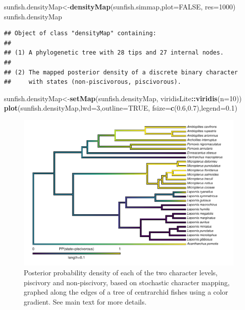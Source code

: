 \documentclass[fleqn,10pt,lineno]{wlpeerj} %
\newenvironment{Shaded}{\begin{snugshade}}{\end{snugshade}}
\newcommand{\AttributeTok}[1]{\textcolor[rgb]{0.13,0.29,0.53}{#1}}
\newcommand{\ConstantTok}[1]{\textcolor[rgb]{0.56,0.35,0.01}{#1}}
\newcommand{\DecValTok}[1]{\textcolor[rgb]{0.00,0.00,0.81}{#1}}
\newcommand{\FloatTok}[1]{\textcolor[rgb]{0.00,0.00,0.81}{#1}}
\newcommand{\FunctionTok}[1]{\textcolor[rgb]{0.13,0.29,0.53}{\textbf{#1}}}
\newcommand{\NormalTok}[1]{#1}
\newcommand{\OtherTok}[1]{\textcolor[rgb]{0.56,0.35,0.01}{#1}}
\newcommand{\SpecialCharTok}[1]{\textcolor[rgb]{0.81,0.36,0.00}{\textbf{#1}}}
\begin{document}
\begin{Shaded}
\begin{Highlighting}[]
\NormalTok{sunfish.densityMap}\OtherTok{\textless{}{-}}\FunctionTok{densityMap}\NormalTok{(sunfish.simmap,}\AttributeTok{plot=}\ConstantTok{FALSE}\NormalTok{,}
  \AttributeTok{res=}\DecValTok{1000}\NormalTok{)}
\NormalTok{sunfish.densityMap}
\end{Highlighting}
\end{Shaded}

\begin{verbatim}
## Object of class "densityMap" containing:
## 
## (1) A phylogenetic tree with 28 tips and 27 internal nodes.
## 
## (2) The mapped posterior density of a discrete binary character
##     with states (non-piscivorous, piscivorous).
\end{verbatim}

\begin{Shaded}
\begin{Highlighting}[]
\NormalTok{sunfish.densityMap}\OtherTok{\textless{}{-}}\FunctionTok{setMap}\NormalTok{(sunfish.densityMap,}
\NormalTok{  viridisLite}\SpecialCharTok{::}\FunctionTok{viridis}\NormalTok{(}\AttributeTok{n=}\DecValTok{10}\NormalTok{))}
\FunctionTok{plot}\NormalTok{(sunfish.densityMap,}\AttributeTok{lwd=}\DecValTok{3}\NormalTok{,}\AttributeTok{outline=}\ConstantTok{TRUE}\NormalTok{,}
  \AttributeTok{fsize=}\FunctionTok{c}\NormalTok{(}\FloatTok{0.6}\NormalTok{,}\FloatTok{0.7}\NormalTok{),}\AttributeTok{legend=}\FloatTok{0.1}\NormalTok{)}
\end{Highlighting}
\end{Shaded}

\begin{figure}
\includegraphics[width=1\linewidth]{Revell.phytools-v2_peerj_files/figure-latex/densityMap-1} \caption{Posterior probability density of each of the two character levels, piscivory and non-piscivory, based on stochastic character mapping, graphed along the edges of a tree of centrarchid fishes using a color gradient. See main text for more details.}\label{fig:densityMap}
\end{figure}
\end{document}
